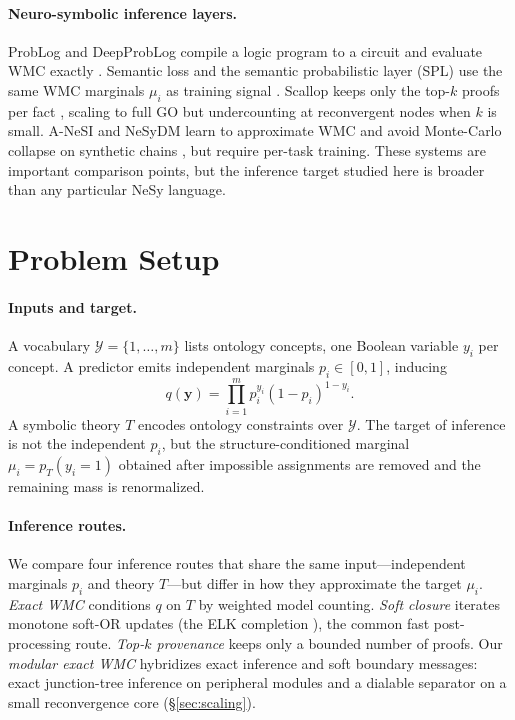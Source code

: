 \documentclass[letterpaper]{article}
\newcommand{\bC}[1]{\boldsymbol{#1}}
\begin{document}
\paragraph{Neuro-symbolic inference layers.}
ProbLog and DeepProbLog compile a logic program to a circuit and evaluate WMC exactly \citep{deraedt2007problog,manhaeve2018deepproblog}. Semantic loss and the semantic probabilistic layer (SPL) use the same WMC marginals $\mu_i$ as training signal \citep{xu2018semanticloss,ahmed2022spl}. Scallop keeps only the top-$k$ proofs per fact \citep{huang2021scallop,li2023scallop}, scaling to full GO but undercounting at reconvergent nodes when $k$ is small. A-NeSI and NeSyDM learn to approximate WMC and avoid Monte-Carlo collapse on synthetic chains \citep{vankrieken2023anesi,vankrieken2025nesydm}, but require per-task training. These systems are important comparison points, but the inference target studied here is broader than any particular NeSy language.

\section{Problem Setup}\label{sec:problem}
\paragraph{Inputs and target.}
A vocabulary $\mathcal{Y}=\{1,\dots,m\}$ lists ontology concepts, one Boolean variable $y_i$ per concept. A predictor emits independent marginals $p_i\in[0,1]$, inducing
\[
q(\bC y)=\prod_{i=1}^{m}p_i^{y_i}(1-p_i)^{1-y_i}.
\]
A symbolic theory $T$ encodes ontology constraints over $\mathcal{Y}$. The target of inference is not the independent $p_i$, but the structure-conditioned marginal $\mu_i=p_T(y_i{=}1)$ obtained after impossible assignments are removed and the remaining mass is renormalized.

\paragraph{Inference routes.}
We compare four inference routes that share the same input---independent marginals $p_i$ and theory $T$---but differ in how they approximate the target $\mu_i$. \textit{Exact WMC} conditions $q$ on $T$ by weighted model counting. \textit{Soft closure} iterates monotone soft-OR updates (the ELK completion \citep{kazakov2014elk}), the common fast post-processing route. \textit{Top-$k$ provenance} keeps only a bounded number of proofs. Our \textit{modular exact WMC} hybridizes exact inference and soft boundary messages: exact junction-tree inference on peripheral modules and a dialable separator on a small reconvergence core (\S\ref{sec:scaling}).
\end{document}
